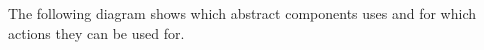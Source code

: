 \label{overviewabstcomp}
The following diagram shows which abstract components \app{} uses and for which actions they can be used for.  



